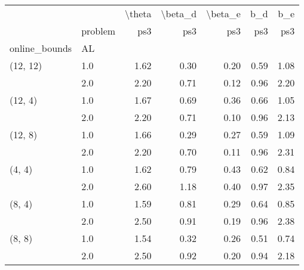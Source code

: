 \begin{tabular}{llrrrrr}
\toprule
       & {} & \textbackslash theta & \textbackslash beta\_d & \textbackslash beta\_e &  b\_d &  b\_e \\
       & problem &    ps3 &     ps3 &     ps3 &  ps3 &  ps3 \\
online\_bounds & AL &        &         &         &      &      \\
\midrule
(12, 12) & 1.0 &   1.62 &    0.30 &    0.20 & 0.59 & 1.08 \\
       & 2.0 &   2.20 &    0.71 &    0.12 & 0.96 & 2.20 \\
(12, 4) & 1.0 &   1.67 &    0.69 &    0.36 & 0.66 & 1.05 \\
       & 2.0 &   2.20 &    0.71 &    0.10 & 0.96 & 2.13 \\
(12, 8) & 1.0 &   1.66 &    0.29 &    0.27 & 0.59 & 1.09 \\
       & 2.0 &   2.20 &    0.70 &    0.11 & 0.96 & 2.31 \\
(4, 4) & 1.0 &   1.62 &    0.79 &    0.43 & 0.62 & 0.84 \\
       & 2.0 &   2.60 &    1.18 &    0.40 & 0.97 & 2.35 \\
(8, 4) & 1.0 &   1.59 &    0.81 &    0.29 & 0.64 & 0.85 \\
       & 2.0 &   2.50 &    0.91 &    0.19 & 0.96 & 2.38 \\
(8, 8) & 1.0 &   1.54 &    0.32 &    0.26 & 0.51 & 0.74 \\
       & 2.0 &   2.50 &    0.92 &    0.20 & 0.94 & 2.18 \\
\bottomrule
\end{tabular}
